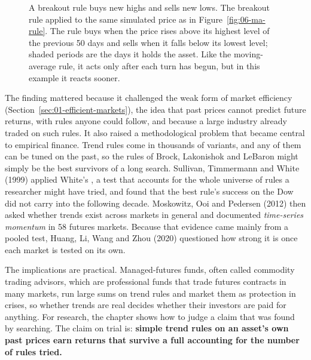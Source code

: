 \begin{figure}[htbp]
\caption{A breakout rule buys new highs and sells new lows. The breakout rule applied to the same simulated price as in Figure~\ref{fig:06-ma-rule}. The rule buys when the price rises above its highest level of the previous 50 days and sells when it falls below its lowest level; shaded periods are the days it holds the asset. Like the moving-average rule, it acts only after each turn has begun, but in this example it reacts sooner.}
\label{fig:06-breakout-rule}
\end{figure}


The finding mattered because it challenged the weak form of market efficiency (Section~\ref{sec:01-efficient-markets}), the idea that past prices cannot predict future returns, with rules anyone could follow, and because a large industry already traded on such rules. It also raised a methodological problem that became central to empirical finance. Trend rules come in thousands of variants, and any of them can be tuned on the past, so the rules of Brock, Lakonishok and LeBaron might simply be the best survivors of a long search. Sullivan, Timmermann and White (1999) applied White's , a test that accounts for the whole universe of rules a researcher might have tried, and found that the best rule's success on the Dow did not carry into the following decade. Moskowitz, Ooi and Pedersen (2012) then asked whether trends exist across markets in general and documented \emph{time-series momentum} in 58 futures markets. Because that evidence came mainly from a pooled test, Huang, Li, Wang and Zhou (2020) questioned how strong it is once each market is tested on its own.

The implications are practical. Managed-futures funds, often called commodity trading advisors, which are professional funds that trade futures contracts in many markets, run large sums on trend rules and market them as protection in crises, so whether trends are real decides whether their investors are paid for anything. For research, the chapter shows how to judge a claim that was found by searching. The claim on trial is: \textbf{simple trend rules on an asset's own past prices earn returns that survive a full accounting for the number of rules tried.}

